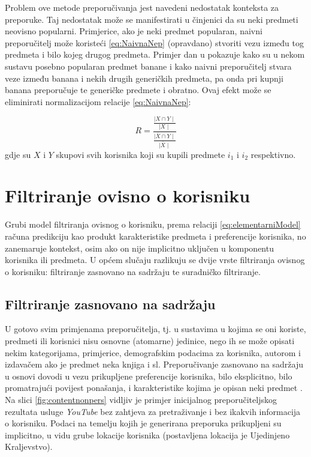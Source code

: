 \documentclass[times, utf8, diplomski, numeric]{fer}
\begin{document}
Problem ove metode preporučivanja jest navedeni nedostatak konteksta za
preporuke. Taj nedostatak može se manifestirati u činjenici da su neki predmeti
neovisno popularni. Primjerice, ako je neki predmet popularan, naivni
preporučitelj može koristeći \ref {eq:NaivnaNep} (opravdano) stvoriti vezu
između tog predmeta i bilo kojeg drugog predmeta. Primjer dan u
\cite{courseraRC} pokazuje kako su u nekom sustavu posebno popularan predmet
banane i kako naivni preporučitelj stvara veze između banana i nekih drugih
generičkih predmeta, pa onda pri kupnji banana preporučuje te generičke predmete
i obratno. Ovaj efekt može se eliminirati normalizacijom relacije
\ref{eq:NaivnaNep}:

\begin{equation}
\label{eq:nepersonalizirani}
	R = \frac
		{\frac
			{\mid X \cap Y \mid}
			{\mid X \mid}}
		{\frac
			{\mid \overline{X} \cap Y\mid}
			{\mid \overline{X} \mid}}
\end{equation}
gdje su $X$ i $Y$ skupovi svih korisnika koji su kupili predmete $i_1$ i $i_2$
respektivno.

\section{Filtriranje ovisno o korisniku}
Grubi model filtriranja ovisnog o korisniku, prema relaciji
\ref{eq:elementarniModel} računa predikciju kao produkt karakteristike predmeta
i preferencije korisnika, no zanemaruje kontekst, osim ako on nije implicitno
uključen u komponentu korisnika ili predmeta. U općem slučaju razlikuju se dvije
vrste filtriranja ovisnog o korisniku: filtriranje zasnovano na sadržaju te
suradničko filtriranje.

\subsection{Filtriranje zasnovano na sadržaju}
U gotovo svim primjenama preporučitelja, tj. u sustavima u kojima se oni
koriste, predmeti ili korisnici nisu osnovne (atomarne) jedinice, nego ih se
može opisati nekim kategorijama, primjerice, demografskim podacima za korisnika,
autorom i izdavačem ako je predmet neka knjiga i sl. Preporučivanje zasnovano
na sadržaju u osnovi dovodi u vezu prikupljene preferencije korisnika, bilo
eksplicitno, bilo promatrajući povijest ponašanja, i karakteristike kojima je
opisan neki predmet \cite{RSHandbook}. Na slici \ref{fig:contentnonpers} vidljiv
je primjer inicijalnog preporučiteljskog rezultata usluge \emph{YouTube} bez
zahtjeva za pretraživanje i bez ikakvih informacija o korisniku. Podaci na
temelju kojih je generirana preporuka prikupljeni su implicitno, u vidu grube
lokacije korisnika (postavljena lokacija je Ujedinjeno Kraljevstvo).
\end{document}
